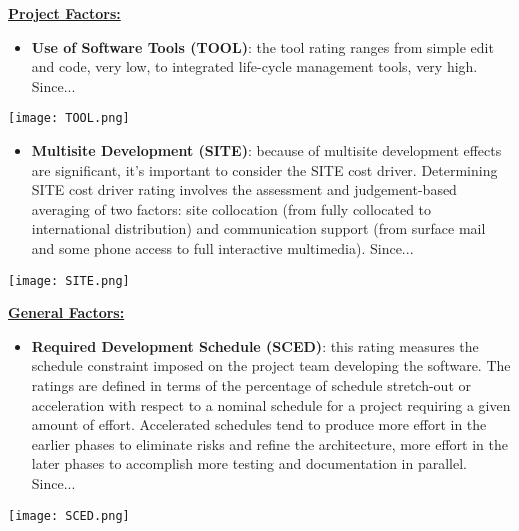 \textbf{\underline{Project Factors:}}

\begin{itemize}
	\item \textbf{Use of Software Tools (TOOL)}: the tool rating ranges from simple edit and code, very low, to integrated life-cycle management tools, very high.  Since... \todo{}
\end{itemize}
\begin{center}
	\texttt{[image: TOOL.png]}
\end{center}

\begin{itemize}
	\item \textbf{Multisite Development (SITE)}: because of multisite development effects are significant, it's important to consider the SITE cost driver. Determining SITE cost driver rating involves the assessment and judgement-based averaging of two factors: site collocation (from fully collocated to international distribution) and communication	support (from surface mail and some phone access to full interactive multimedia).  Since... \todo{}
\end{itemize}
\begin{center}
	\texttt{[image: SITE.png]}
\end{center}

\textbf{\underline{General Factors:}}

\begin{itemize}
	\item \textbf{Required Development Schedule (SCED)}: this rating measures the schedule constraint imposed on the project team developing the software. The ratings are defined in terms of the percentage of schedule stretch-out or acceleration with respect to a nominal schedule for a project requiring a given amount of effort. Accelerated schedules tend to produce more effort in the earlier phases to eliminate risks and refine the architecture, more effort in the later phases to accomplish more testing and
	documentation in parallel.  Since... \todo{}
\end{itemize}
\begin{center}
	\texttt{[image: SCED.png]}
\end{center}

